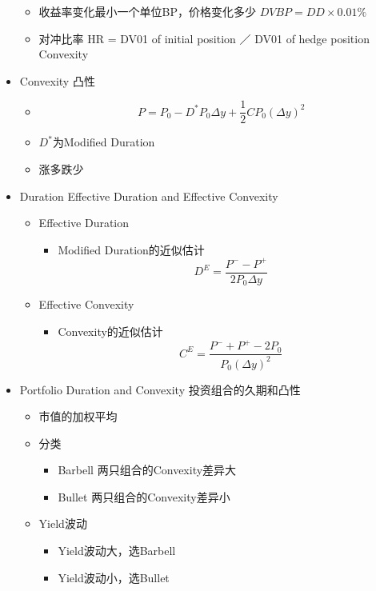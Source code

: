 \documentclass[a4paper,6pt,twoside,openany]{article}
\begin{document}
\begin{itemize}
\begin{itemize}
  \item 收益率变化最小一个单位BP，价格变化多少 $DVBP = DD \times 0.01\%$
  \item 对冲比率 HR = DV01 of initial position ／ DV01 of hedge position
    Convexity
  \end{itemize}
\item Convexity 凸性
  \begin{itemize}
  \item $$P = P_0 - D^*P_0\Delta y + \frac{1}{2}CP_0(\Delta y)^2$$
  \item $D^*$为Modified
    Duration
  \item 涨多跌少
  \end{itemize}
\item Duration Effective Duration and Effective Convexity
  \begin{itemize}
  \item Effective Duration
    \begin{itemize}
    \item Modified Duration的近似估计 $$D^E = \frac{P^- - P^+}{2P_0\Delta y}$$
    \end{itemize}
  \item Effective Convexity
    \begin{itemize}
    \item Convexity的近似估计 $$C^E = \frac{P^- + P^+ - 2P_0}{P_0(\Delta y)^2}$$
    \end{itemize}
  \end{itemize}

\item Portfolio Duration and Convexity 投资组合的久期和凸性
  \begin{itemize}
  \item 市值的加权平均
  \item 分类
    \begin{itemize}
    \item Barbell 两只组合的Convexity差异大
    \item Bullet 两只组合的Convexity差异小
    \end{itemize}
  \item Yield波动
    \begin{itemize}
    \item Yield波动大，选Barbell
    \item Yield波动小，选Bullet
    \end{itemize}
  \end{itemize}

\end{itemize}
\end{document}

